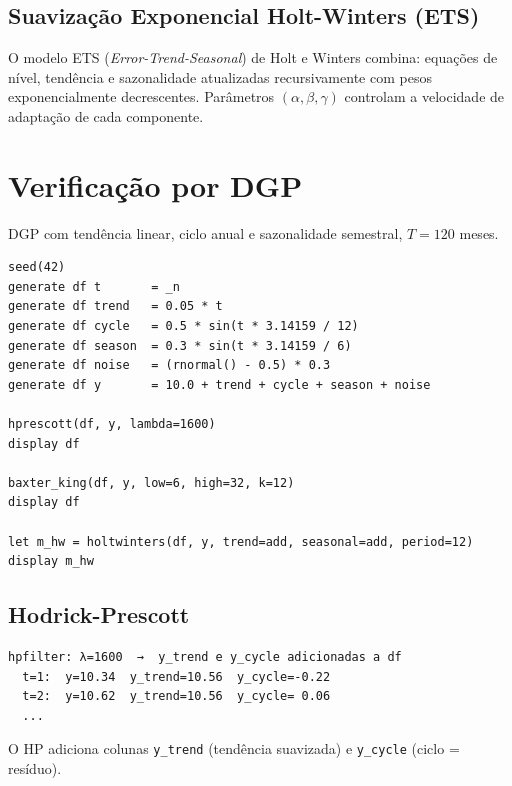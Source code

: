 \subsection*{Suavização Exponencial Holt-Winters (ETS)}

O modelo ETS (\emph{Error-Trend-Seasonal}) de Holt e Winters combina:
equações de nível, tendência e sazonalidade atualizadas recursivamente com
pesos exponencialmente decrescentes. Parâmetros $(\alpha, \beta, \gamma)$
controlam a velocidade de adaptação de cada componente.

\section{Verificação por DGP}

DGP com tendência linear, ciclo anual e sazonalidade semestral, $T = 120$ meses.

\begin{lstlisting}[caption={Séries com tendência, ciclo e sazonalidade}]
seed(42)
generate df t       = _n
generate df trend   = 0.05 * t
generate df cycle   = 0.5 * sin(t * 3.14159 / 12)
generate df season  = 0.3 * sin(t * 3.14159 / 6)
generate df noise   = (rnormal() - 0.5) * 0.3
generate df y       = 10.0 + trend + cycle + season + noise

hprescott(df, y, lambda=1600)
display df

baxter_king(df, y, low=6, high=32, k=12)
display df

let m_hw = holtwinters(df, y, trend=add, seasonal=add, period=12)
display m_hw
\end{lstlisting}

\subsection*{Hodrick-Prescott}

\begin{lstlisting}[language={}, basicstyle=\ttfamily\small,
  frame=none, numbers=none, backgroundcolor=\color{codbg},
  xleftmargin=0pt, xrightmargin=0pt, breaklines=false]
hpfilter: λ=1600  →  y_trend e y_cycle adicionadas a df
  t=1:  y=10.34  y_trend=10.56  y_cycle=-0.22
  t=2:  y=10.62  y_trend=10.56  y_cycle= 0.06
  ...
\end{lstlisting}

O HP adiciona colunas \texttt{y\_trend} (tendência suavizada) e \texttt{y\_cycle}
(ciclo = resíduo).

